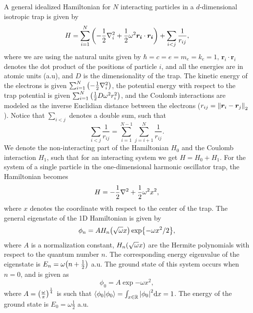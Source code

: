 A general idealized Hamiltonian for $N$ interacting particles in a $d$-dimensional isotropic trap is given by 
\begin{equation}
    H = \sum_{i=1}^N \qty(-\frac{1}{2}\laplacian_i+ \frac{1}{2}\omega^2 \bm{r_i}\cdot\bm{r_i}) + \sum_{i<j}\frac{1}{r_{ij}}, 
\end{equation}
where we are using the natural units given by $\hbar=c=e=m_e=k_e=1$, $\bm{r}_i\cdot\bm{r}_i$ denotes the dot product of the positions of particle $i$, and all the energies are in atomic units (a.u), and $D$ is the dimensionality of the trap. The kinetic energy of the electrons is given $\sum_{i=1}^N\qty(-\frac{1}{2}\laplacian_i)$, the potential energy with respect to the trap potential is given $\sum_{i=1}^N \qty(\frac{1}{2}D\omega^2r_i^2)$, and the Coulomb interactions are modeled as the inverse Euclidian distance between the electrons ($r_{ij} = \norm{\bm{r}_i-\bm{r}_j}_2$). Notice that $\sum_{i<j}$ denotes a double sum, such that 
\begin{equation}
    \sum_{i<j}\frac{1}{r_{ij}} = \sum_{i=1}^{N-1}\sum_{j=i+1}^N\frac{1}{r_{ij}}. 
\end{equation}
We denote the non-interacting part of the Hamiltonian $H_0$ and the Coulomb interaction $H_1$, such that for an interacting system we get $H = H_0 + H_1$. For the system of a single particle in the one-dimensional harmonic oscillator trap, the Hamiltonian becomes
\begin{equation}\label{eq:1dHamiltonian}
    H = -\frac{1}{2}\laplacian + \frac{1}{2}\omega^2 x^2, 
\end{equation}
where $x$ denotes the coordinate with respect to the center of the trap. The general eigenstate of the 1D Hamiltonian is given by  
\begin{equation}
    \phi_n = AH_n\qty(\sqrt{\omega}x)\exp{-\omega x^2/2}, 
\end{equation}
where $A$ is a normalization constant, $H_n\qty(\sqrt{\omega}x)$ are the Hermite polynomials with respect to the quantum number $n$. The corresponding energy eigenvalue of the eigenstate is $E_n = \omega\qty(n + \frac{1}{2})$ a.u. The ground state of this system occurs when $n=0$, and is given as 
\begin{equation}
    \phi_0 = A\exp{-\omega x^2}, 
\end{equation}
where $A = \qty(\frac{\omega}{\pi})^{\frac{1}{4}}$ is such that $\braket{\phi_0} = \int_{x\in\mathbb{R}}\abs{\phi_0}^2\mathrm{d}x = 1$. The energy of the ground state is $E_0 = \omega\frac{1}{2}$ a.u. 

